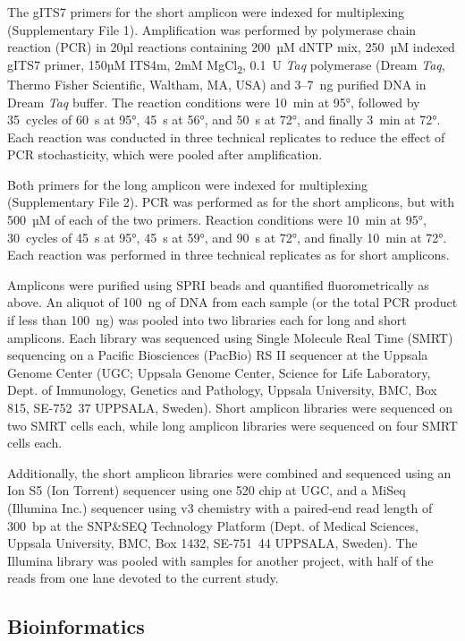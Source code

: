 \documentclass[
  12pt,
]{article}
\begin{document}
The gITS7 primers for the short amplicon were indexed for multiplexing (Supplementary File 1).
Amplification was performed by polymerase chain reaction (PCR) in 20µl reactions containing 200~µM dNTP mix, 250~µM indexed gITS7 primer, 150µM ITS4m, 2mM MgCl\textsubscript{2}, 0.1~U \emph{Taq} polymerase (Dream \emph{Taq}, Thermo Fisher Scientific, Waltham, MA, USA) and 3--7~ng purified DNA in Dream \emph{Taq} buffer.
The reaction conditions were 10~min at 95°, followed by 35~cycles of 60~s at 95°, 45~s at 56°, and 50~s at 72°, and finally 3~min at 72°.
Each reaction was conducted in three technical replicates to reduce the effect of PCR stochasticity, which were pooled after amplification.

Both primers for the long amplicon were indexed for multiplexing (Supplementary File 2).
PCR was performed as for the short amplicons, but with 500~µM of each of the two primers.
Reaction conditions were 10~min at 95°, 30~cycles of 45~s at 95°, 45~s at 59°, and 90~s at 72°, and finally 10~min at 72°.
Each reaction was performed in three technical replicates as for short amplicons.

Amplicons were purified using SPRI beads \autocite{vesterinen2016} and quantified fluorometrically as above.
An aliquot of 100~ng of DNA from each sample (or the total PCR product if less than 100~ng) was pooled into two libraries each for long and short amplicons.
Each library was sequenced using Single Molecule Real Time (SMRT) sequencing on a Pacific Biosciences (PacBio) RS II sequencer at the Uppsala Genome Center (UGC; Uppsala Genome Center, Science
for Life Laboratory, Dept. of Immunology, Genetics and Pathology, Uppsala University, BMC, Box 815, SE-752~37 UPPSALA, Sweden).
Short amplicon libraries were sequenced on two SMRT cells each, while long amplicon libraries were sequenced on four SMRT cells each.

Additionally, the short amplicon libraries were combined and sequenced using an Ion S5 (Ion Torrent) sequencer using one 520 chip at UGC, and a MiSeq (Illumina Inc.) sequencer using v3 chemistry with a paired-end read length of 300~bp at the SNP\&SEQ Technology Platform (Dept. of Medical Sciences, Uppsala University, BMC, Box 1432, SE-751~44 UPPSALA, Sweden).
The Illumina library was pooled with samples for another project, with half of the reads from one lane devoted to the current study.

\hypertarget{bioinformatics}{%
\subsection{Bioinformatics}\label{bioinformatics}}
\end{document}
